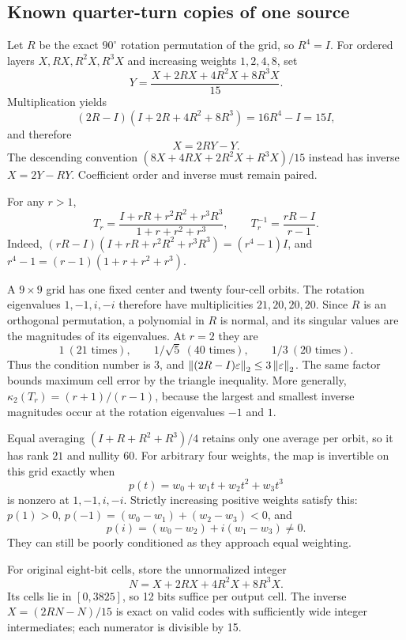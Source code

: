 \subsection{Known quarter-turn copies of one source}

Let \(R\) be the exact \(90^\circ\) rotation permutation of the grid, so
\(R^4=I\). For ordered layers \(X,RX,R^2X,R^3X\) and increasing weights
\(1,2,4,8\), set
\begin{equation}
 Y=\frac{X+2RX+4R^2X+8R^3X}{15}.
 \label{eq:rotation}
\end{equation}
Multiplication yields
\[
 (2R-I)(I+2R+4R^2+8R^3)=16R^4-I=15I,
\]
and therefore
\begin{equation}
 \boxed{X=2RY-Y.}
\end{equation}
The descending convention
\((8X+4RX+2R^2X+R^3X)/15\) instead has inverse \(X=2Y-RY\).
Coefficient order and inverse must remain paired.

For any \(r>1\),
\[
 T_r=\frac{I+rR+r^2R^2+r^3R^3}{1+r+r^2+r^3},
 \qquad
 T_r^{-1}=\frac{rR-I}{r-1}.
\]
Indeed,
\((rR-I)(I+rR+r^2R^2+r^3R^3)=(r^4-1)I\),
and \(r^4-1=(r-1)(1+r+r^2+r^3)\).

A \(9\times9\) grid has one fixed center and twenty four-cell orbits.
The rotation eigenvalues \(1,-1,i,-i\) therefore have multiplicities
\(21,20,20,20\). Since \(R\) is an orthogonal permutation, a polynomial
in \(R\) is normal, and its singular values are the magnitudes of its
eigenvalues. At \(r=2\) they are
\[
 1\ (21\text{ times}),\qquad
 1/\sqrt5\ (40\text{ times}),\qquad
 1/3\ (20\text{ times}).
\]
Thus the condition number is \(3\), and
\(\left\lVert(2R-I)\varepsilon\right\rVert_2\le3\left\lVert\varepsilon\right\rVert_2\).
The same factor bounds maximum cell error by the triangle inequality.
More generally,
\(\kappa_2(T_r)=(r+1)/(r-1)\), because the largest and smallest
inverse magnitudes occur at the rotation eigenvalues \(-1\) and \(1\).

Equal averaging \((I+R+R^2+R^3)/4\) retains only one average per orbit,
so it has rank \(21\) and nullity \(60\). For arbitrary four weights, the
map is invertible on this grid exactly when
\[
 p(t)=w_0+w_1t+w_2t^2+w_3t^3
\]
is nonzero at \(1,-1,i,-i\). Strictly increasing positive weights satisfy
this: \(p(1)>0\), \(p(-1)=(w_0-w_1)+(w_2-w_3)<0\), and
\[
 p(i)=(w_0-w_2)+i(w_1-w_3)\ne0.
\]
They can still be poorly conditioned as they approach equal weighting.

For original eight-bit cells, store the unnormalized integer
\[
 N=X+2RX+4R^2X+8R^3X.
\]
Its cells lie in \([0,3825]\), so 12 bits suffice per output cell.
The inverse \(X=(2RN-N)/15\) is exact on valid codes with sufficiently
wide integer intermediates; each numerator is divisible by 15.

